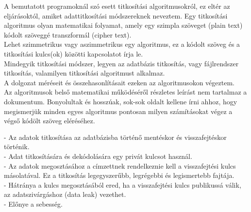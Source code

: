 
A bemutatott programoknál szó esett titkosítási algoritmusokról, ez eltér az eljárásoktól, amiket adattitkosítási módszereknek neveztem. Egy titkosítási algoritmus olyan matematikai folyamat, amely egy szimpla szöveget (plain text) kódolt szöveggé transzformál (cipher text).
\\ Lehet szimmetrikus vagy aszimmetrikus egy algoritmus, ez a kódolt szöveg és a titkosítási kulcs(ok) közötti kapcsolatot írja le.
\vspace{5pt}\\Mindegyik titkosítási módszer, legyen az adatbázis titkosítás, vagy fájlrendszer titkosítás, valamilyen titkosítási algoritmust alkalmaz.
\\A dolgozat méréseit és összehasonlításait ezeken az algoritmusokon végeztem.
\vspace{5pt}\\Az algoritmusok belső matematikai működéséről részletes leírást nem tartalmaz a dokumentum. Bonyolultak és hosszúak, sok-sok oldalt kellene írni ahhoz, hogy megismerjük minden egyes algoritmus pontosan milyen számításokat végez a végső kódölt szöveg eléréséhez.
 
\noindent - Az adatok titkosítása az adatbázisba történő mentéskor és visszafejtéskor történik.
\\- Adat titkosítására és dekódolására egy privát kulcsot használ.
\\- Az adatok megosztásához a címzettnek rendelkeznie kell a visszafejtési kulcs másolatával. Ez a titkosítás legegyszerűbb, legrégebbi és legismertebb fajtája.
\\- Hátránya a kulcs megosztásából ered, ha a visszafejtési kulcs publikussá válik, az adatszivárgáshoz (data leak) vezethet.
\\- Előnye a sebesség. \newline

